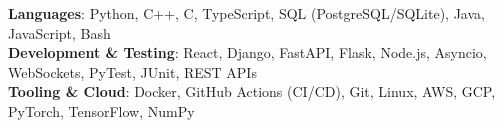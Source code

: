 \begin{itemize}[leftmargin=0.15in, label={}]
    \small{\item{
     \textbf{Languages}{: Python, C++, C, TypeScript, SQL (PostgreSQL/SQLite), Java, JavaScript, Bash} \\
     \textbf{Development \& Testing}{: React, Django, FastAPI, Flask, Node.js, Asyncio, WebSockets, PyTest, JUnit, REST APIs} \\
     \textbf{Tooling \& Cloud}{: Docker, GitHub Actions (CI/CD), Git, Linux, AWS, GCP, PyTorch, TensorFlow, NumPy} \\
    }}
\end{itemize}
